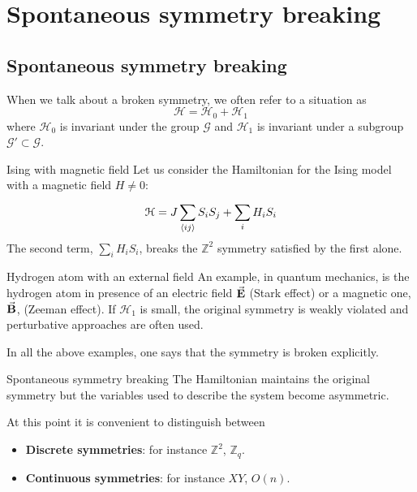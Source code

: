 \documentclass[../main/main.tex]{subfiles}
\begin{document}
\chapter{Spontaneous symmetry breaking}


\section{Spontaneous symmetry breaking}

When we talk about a broken symmetry, we often refer to a situation as
\begin{equation*}
  \mathcal{H} = \mathcal{H}_0 + \mathcal{H}_1
\end{equation*}
where \( \mathcal{H}_0 \)  is invariant under the group \( \mathcal{G} \) and \( \mathcal{H}_1 \) is invariant under a subgroup \( \mathcal{G}' \subset  \mathcal{G}\).

\begin{example}{Ising with magnetic field}{}
  Let us consider the Hamiltonian for the Ising model with a magnetic field \( H \neq 0 \):
\begin{equation*}
  \mathcal{H} = J \sum_{\expval{ij} }^{} S_i S_j + \sum_{i}^{} H_i S_i
\end{equation*}
The second term, \( \sum_{i}^{}  H_i S_i \), breaks the \( \mathbb{Z}^2 \) symmetry satisfied by the first alone.
\end{example}

\begin{example}{Hydrogen atom with an external field}{}
  An example, in quantum mechanics, is the hydrogen atom in presence of an electric field \( \va{E} \) (Stark effect) or a magnetic one, \( \va{B} \), (Zeeman effect). If \( \mathcal{H}_1 \) is small, the original symmetry is weakly violated and perturbative approaches are often used.
\end{example}

In all the above examples, one says that the symmetry is broken explicitly.

\begin{definition}{Spontaneous symmetry breaking}{}
The Hamiltonian maintains the original symmetry but the variables used to describe the system become asymmetric.
\end{definition}

At this point it is convenient to distinguish between
\begin{itemize}
\item \textbf{Discrete symmetries}: for instance \( \mathbb{Z}^2 \), \( \mathbb{Z}_q \).
\item \textbf{Continuous symmetries}: for instance \( XY \), \( O(n) \).
\end{itemize}
\end{document}
